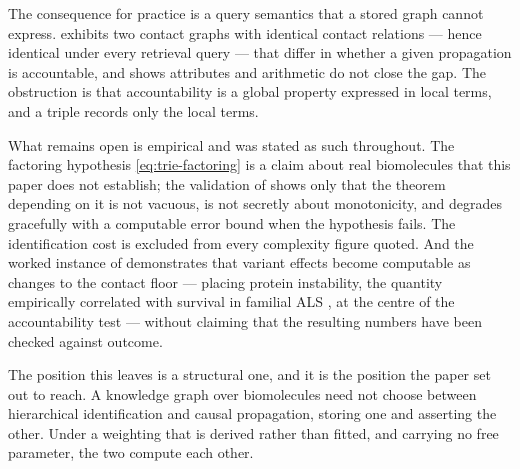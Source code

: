\documentclass[11pt,twocolumn,a4paper]{article}
\theoremstyle{thmstyle}
\theoremstyle{definition}
\theoremstyle{remark}
\begin{document}
The consequence for practice is a query semantics that a stored graph
cannot express.  exhibits two contact graphs
with identical contact relations --- hence identical under every
retrieval query --- that differ in whether a given propagation is
accountable, and  shows attributes and arithmetic
do not close the gap. The obstruction is that accountability is a
global property expressed in local terms, and a triple records only the
local terms.

What remains open is empirical and was stated as such throughout. The
factoring hypothesis \eqref{eq:trie-factoring} is a claim about real
biomolecules that this paper does not establish; the validation of
 shows only that the theorem depending on it is
not vacuous, is not secretly about monotonicity, and degrades
gracefully with a computable error bound when the hypothesis fails. The
identification cost is excluded from every complexity figure quoted.
And the worked instance of  demonstrates that variant
effects become computable as changes to the contact floor --- placing
protein instability, the quantity empirically correlated with survival
in familial ALS \citep{wang2008,prudencio2009}, at the centre of the
accountability test --- without claiming that the resulting numbers
have been checked against outcome.

The position this leaves is a structural one, and it is the position
the paper set out to reach. A knowledge graph over biomolecules need
not choose between hierarchical identification and causal propagation,
storing one and asserting the other. Under a weighting that is derived
rather than fitted, and carrying no free parameter, the two compute
each other.





\end{document}
